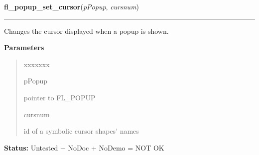 \hspace{.8\funcindent}\begin{boxedminipage}{\funcwidth}

    \raggedright \textbf{fl\_popup\_set\_cursor}(\textit{pPopup}, \textit{cursnum})

    \vspace{-1.5ex}

    \rule{\textwidth}{0.5\fboxrule}
\setlength{\parskip}{2ex}
    Changes the cursor displayed when a popup is shown.

\setlength{\parskip}{1ex}
      \textbf{Parameters}
      \vspace{-1ex}

      \begin{quote}
        \begin{Ventry}{xxxxxxx}

          \item[pPopup]

          pointer to FL\_POPUP

          \item[cursnum]

          id of a symbolic cursor shapes' names

        \end{Ventry}

      \end{quote}

\textbf{Status:} Untested + NoDoc + NoDemo = NOT OK



    \end{boxedminipage}

    \label{xformslib:flpopup:fl_popup_get_title}

    \vspace{0.5ex}

